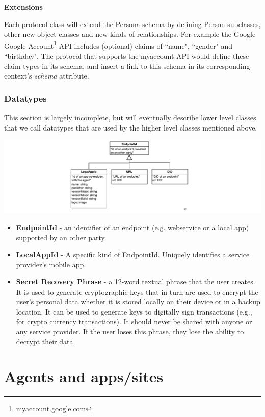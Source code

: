 \documentclass[11pt, oneside]{article}   	%
\newcommand{\hyperfootnote}[1][]{\def\ArgI{{#1}}\hyperfootnoteRelay}
\newcommand\hyperfootnoteRelay[2][]{\href{#1#2}{\ArgI}\footnote{\href{#1#2}{#2}}}
\begin{document}
\textbf{Extensions}

Each protocol class will extend the Persona schema by defining Person subclasses, other new object classes and new kinds of relationships. For example the Google
\hyperfootnote[Google Account][https://]{myaccount.google.com}  API includes (optional) claims of ``name", ``gender" and ``birthday". The protocol that supports the myaccount API would define these claim types in its schema, and insert a link to this schema in its corresponding context's \emph{schema} attribute.

\subsubsection{Datatypes}

This section is largely incomplete, but will eventually describe lower level classes that we call datatypes that are used by the higher level classes mentioned above.

\includegraphics[width=\textwidth]{./images/datatypes.png}

\begin{itemize}
\item \textbf{EndpointId} -  an identifier of an endpoint (e.g. webservice or a local app) supported by an other party.
\item \textbf{LocalAppId} - A specific kind of EndpointId. Uniquely identifies a service provider's mobile app. 
\item \textbf{Secret Recovery Phrase} - a 12-word textual phrase that the user creates. It is used to generate cryptographic keys that in turn are used to encrypt the user’s personal data whether it is stored locally on their device or in a backup location. It can be used to generate keys to digitally sign transactions (e.g., for crypto currency transactions). It should never be shared with anyone or any service provider. If the user loses this phrase, they lose the ability to decrypt their data. 
\end{itemize}


\section{Agents and apps/sites} %
\end{document}
